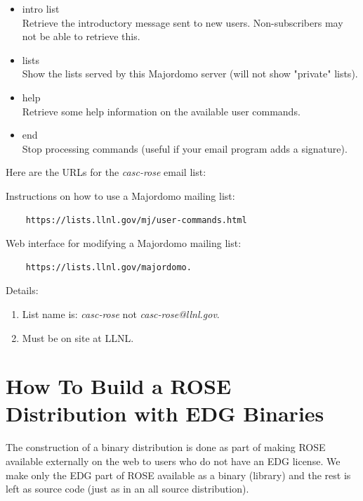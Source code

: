 {\begin{itemize}
   \item intro list \\
    Retrieve the introductory message sent to new users. Non-subscribers may not be able
    to retrieve this.

   \item lists \\
    Show the lists served by this Majordomo server (will not show "private" lists).

   \item help \\
    Retrieve some help information on the available user commands.

   \item end \\
    Stop processing commands (useful if your email program adds a signature). 
\end{itemize}


Here are the URLs for the {\em casc-rose} email list:

Instructions on how to use a Majordomo mailing list: \\
\begin{verbatim}
    https://lists.llnl.gov/mj/user-commands.html
\end{verbatim}

Web interface for modifying a Majordomo mailing list: \\
\begin{verbatim}
    https://lists.llnl.gov/majordomo.
\end{verbatim}

Details: \\
\begin{enumerate}
   \item List name is: {\em casc-rose} not {\em casc-rose@llnl.gov}.
   \item Must be on site at LLNL.
\end{enumerate}

}


\section{How To Build a ROSE Distribution with EDG Binaries}%


   The construction of a binary distribution is done as part of making
ROSE available externally on the web to users who do not have an EDG
license.  We make only the EDG part of ROSE available as a binary (library) 
and the rest is left as source code (just as in an all source distribution).


